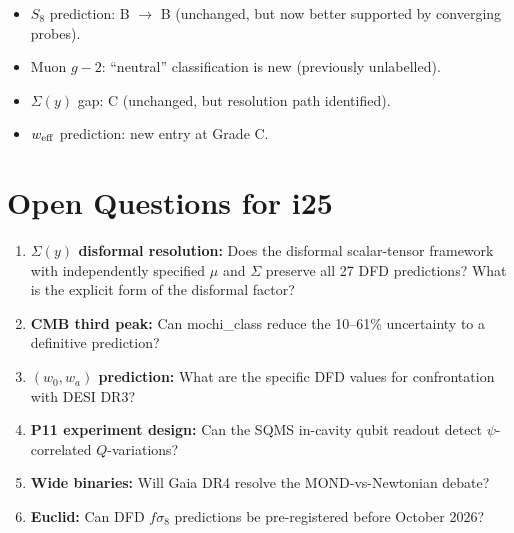 \documentclass[11pt]{article}
\begin{document}
\begin{itemize}
  \item $S_8$ prediction: B $\to$ B (unchanged, but now better supported
    by converging probes).
  \item Muon $g-2$: ``neutral'' classification is new (previously
    unlabelled).
  \item $\Sigma(y)$ gap: C (unchanged, but resolution path identified).
  \item $w_{\rm eff}$ prediction: new entry at Grade C.
\end{itemize}

\section{Open Questions for i25}

\begin{enumerate}
  \item \textbf{$\Sigma(y)$ disformal resolution:} Does the disformal
    scalar-tensor framework with independently specified $\mu$ and
    $\Sigma$ preserve all 27 DFD predictions? What is the explicit
    form of the disformal factor?

  \item \textbf{CMB third peak:} Can mochi\_class reduce the 10--61\%
    uncertainty to a definitive prediction?

  \item \textbf{$(w_0, w_a)$ prediction:} What are the specific DFD
    values for confrontation with DESI DR3?

  \item \textbf{P11 experiment design:} Can the SQMS in-cavity qubit
    readout detect $\psi$-correlated $Q$-variations?

  \item \textbf{Wide binaries:} Will Gaia DR4 resolve the
    MOND-vs-Newtonian debate?

  \item \textbf{Euclid:} Can DFD $f\sigma_8$ predictions be
    pre-registered before October 2026?
\end{enumerate}
\end{document}
